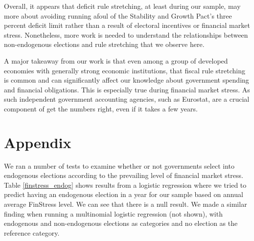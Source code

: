 \documentclass[]{article}
\begin{document}
Overall, it appears that deficit rule stretching, at least during our sample, may more about avoiding running afoul of the Stability and Growth Pact's three percent deficit limit rather than a result of electoral incentives or financial market stress. Nonetheless, more work is needed to understand the relationships between non-endogenous elections and rule stretching that we observe here.

A major takeaway from our work is that even among a group of developed economies with generally strong economic institutions, that fiscal rule stretching is common and can significantly affect our knowledge about government spending and financial obligations. This is especially true during financial market stress. As such independent government accounting agencies, such as Eurostat, are a crucial component of get the numbers right, even if it takes a few years.


\clearpage




\clearpage

\section*{Appendix}

We ran a number of tests to examine whether or not governments select into endogenous elections according to the prevailing level of financial market stress. Table \ref{finstress_endog} shows results from a logistic regression where we tried to predict having an endogenous election in a year for our sample based on annual average FinStress level. We can see that there is a null result. We made a similar finding when running a multinomial logistic regression (not shown), with endogenous and non-endogenous elections as categories and no election as the reference category.


\end{document}
